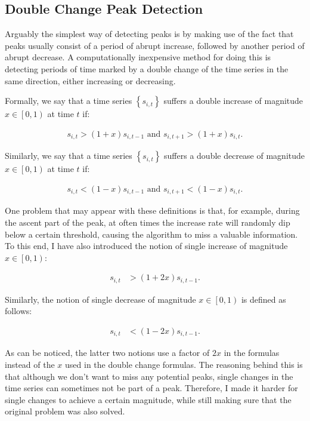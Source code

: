 \subsection{Double Change Peak Detection}
\label{subsec:double-change-peak}

Arguably the simplest way of detecting peaks is by making use of the fact that peaks usually consist of a period of abrupt increase, followed by another period of abrupt decrease. A computationally inexpensive method for doing this is detecting periods of time marked by a double change of the time series in the same direction, either increasing or decreasing.

Formally, we say that a time series $\left\{ s_{i, t} \right\}$ suffers a double increase of magnitude $x \in \left[ 0, 1 \right)$ at time $t$ if:

\begin{align}
\label{eq:double-increase}
s_{i, t} > \left( 1 + x \right) s_{i, t - 1} \textrm{ and } s_{i, t + 1} > \left( 1 + x \right) s_{i, t}.
\end{align}

Similarly, we say that a time series $\left\{ s_{i, t} \right\}$ suffers a double decrease of magnitude $x \in \left[ 0, 1 \right)$ at time $t$ if:

\begin{align}
\label{eq:double-decrease}
s_{i, t} < \left( 1 - x \right) s_{i, t - 1} \textrm{ and } s_{i, t + 1} < \left( 1 - x \right) s_{i, t}.
\end{align}

One problem that may appear with these definitions is that, for example, during the ascent part of the peak, at often times the increase rate will randomly dip below a certain threshold, causing the algorithm to miss a valuable information. To this end, I have also introduced the notion of single increase of magnitude $x \in \left[ 0, 1 \right)$:

\begin{align}
\label{eq:single-increase}
s_{i, t} &> \left( 1 + 2x \right) s_{i, t - 1}.
\end{align}

Similarly, the notion of single decrease of magnitude $x \in \left[ 0, 1 \right)$ is defined as follows:

\begin{align}
\label{eq:single-decrease}
s_{i, t} &< \left( 1 - 2x \right) s_{i, t - 1}.
\end{align}

As can be noticed, the latter two notions use a factor of $2x$ in the formulas instead of the $x$ used in the double change formulas. The reasoning behind this is that although we don't want to miss any potential peaks, single changes in the time series can sometimes not be part of a peak. Therefore, I made it harder for single changes to achieve a certain magnitude, while still making sure that the original problem was also solved.

